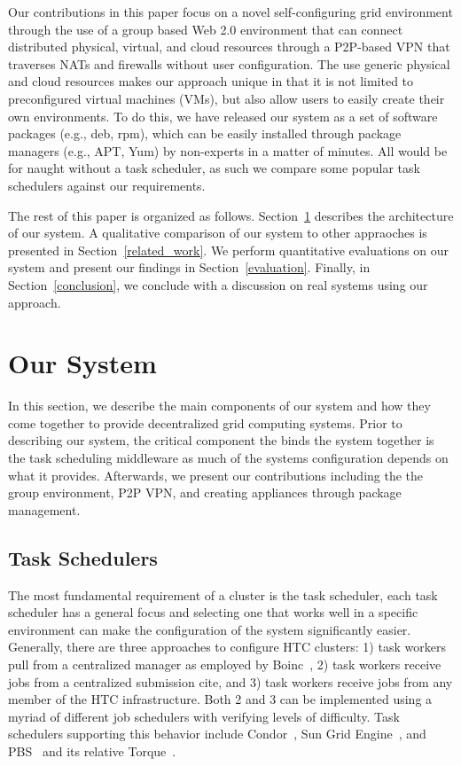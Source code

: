 \documentclass{sig-alternate}
\begin{document}
Our contributions in this paper focus on a novel self-configuring grid
environment through the use of a group based Web 2.0 environment that can
connect distributed physical, virtual, and cloud resources through a P2P-based
VPN that traverses NATs and firewalls without user configuration.  The use
generic physical and cloud resources makes our approach unique in that it is not
limited to preconfigured virtual machines (VMs), but also allow users to easily
create their own environments.  To do this, we have released our system as a set
of software packages (e.g., deb, rpm), which can be easily installed through
package managers (e.g., APT, Yum) by non-experts in a matter of minutes.
All would be for naught without a task scheduler, as such we compare some
popular task schedulers against our requirements.

The rest of this paper is organized as follows.  Section~\ref{our_system}
describes the architecture of our system.  A qualitative comparison of our
system to other appraoches is presented in Section~\ref{related_work}.  We
perform quantitative evaluations on our system and present our findings in
Section~\ref{evaluation}.  Finally, in Section~\ref{conclusion}, we conclude
with a discussion on real systems using our approach.

\section{Our System}
\label{our_system}
In this section, we describe the main components of our system and how they
come together to provide decentralized grid computing systems.  Prior to
describing our system, the critical component the binds the system together
is the task scheduling middleware as much of the systems configuration depends
on what it provides.  Afterwards, we present our contributions including the
the group environment, P2P VPN, and creating appliances through package
management.

\subsection{Task Schedulers}
The most fundamental requirement of a cluster is the task scheduler, each
task scheduler has a general focus and selecting one that works well in a
specific environment can make the configuration of the system significantly
easier.  Generally, there are three approaches to configure HTC clusters: 1)
task workers pull from a centralized manager as employed by Boinc~\cite{boinc},
2) task workers receive jobs from a centralized submission cite, and 3) task
workers receive jobs from any member of the HTC infrastructure.  Both 2 and 3
can be implemented using a myriad of different job schedulers with verifying
levels of difficulty.  Task schedulers supporting this behavior include
Condor~\cite{condor0}, Sun Grid Engine~\cite{grid_engine}, and PBS~\cite{pbs0,
pbs1} and its relative Torque~\cite{torque}.
\end{document}
